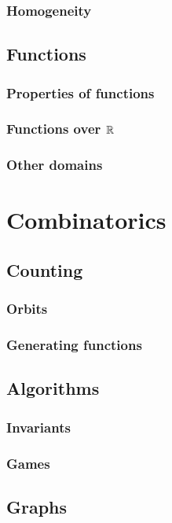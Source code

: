\documentclass{../../large}
\begin{document}
\section{Homogeneity}


\chapter{Functions}
\section{Properties of functions}
\section{Functions over $\mathbb{R}$}
\section{Other domains}




\part{Combinatorics}

\chapter{Counting}
\section{Orbits}
\section{Generating functions}

\chapter{Algorithms}
\section{Invariants}
\section{Games}

\chapter{Graphs}
\end{document}
